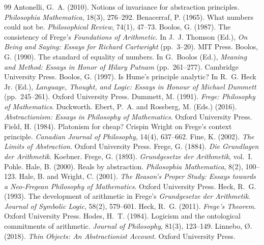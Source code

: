 \documentclass{situationist-preprint}
\begin{document}
\begin{thebibliography}{99}\small
{} Antonelli, G.~A. (2010). Notions of invariance for abstraction principles. \emph{Philosophia Mathematica}, 18(3), 276--292.
 Benacerraf, P. (1965). What numbers could not be. \emph{Philosophical Review}, 74(1), 47--73.
 Boolos, G. (1987). The consistency of Frege's \emph{Foundations of Arithmetic}. In J.~J. Thomson (Ed.), \emph{On Being and Saying: Essays for Richard Cartwright} (pp.~3--20). MIT Press.
 Boolos, G. (1990). The standard of equality of numbers. In G.~Boolos (Ed.), \emph{Meaning and Method: Essays in Honor of Hilary Putnam} (pp.~261--277). Cambridge University Press.
 Boolos, G. (1997). Is Hume's principle analytic? In R.~G. Heck Jr. (Ed.), \emph{Language, Thought, and Logic: Essays in Honour of Michael Dummett} (pp.~245--261). Oxford University Press.
 Dummett, M. (1991). \emph{Frege: Philosophy of Mathematics}. Duckworth.
 Ebert, P.~A. and Rossberg, M. (Eds.) (2016). \emph{Abstractionism: Essays in Philosophy of Mathematics}. Oxford University Press.
 Field, H. (1984). Platonism for cheap? Crispin Wright on Frege's context principle. \emph{Canadian Journal of Philosophy}, 14(4), 637--662.
 Fine, K. (2002). \emph{The Limits of Abstraction}. Oxford University Press.
 Frege, G. (1884). \emph{Die Grundlagen der Arithmetik}. Koebner.
 Frege, G. (1893). \emph{Grundgesetze der Arithmetik}, vol.~I. Pohle.
 Hale, B. (2000). Reals by abstraction. \emph{Philosophia Mathematica}, 8(2), 100--123.
 Hale, B. and Wright, C. (2001). \emph{The Reason's Proper Study: Essays towards a Neo-Fregean Philosophy of Mathematics}. Oxford University Press.
 Heck, R.~G. (1993). The development of arithmetic in Frege's \emph{Grundgesetze der Arithmetik}. \emph{Journal of Symbolic Logic}, 58(2), 579--601.
 Heck, R.~G. (2011). \emph{Frege's Theorem}. Oxford University Press.
 Hodes, H.~T. (1984). Logicism and the ontological commitments of arithmetic. \emph{Journal of Philosophy}, 81(3), 123--149.
 Linnebo, {\O}. (2018). \emph{Thin Objects: An Abstractionist Account}. Oxford University Press.

\end{thebibliography}
\end{document}

